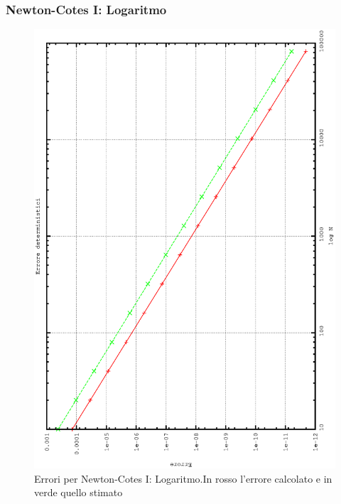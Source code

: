 \subsubsection{Newton-Cotes I: Logaritmo}
\begin{figure}[!h]
\centering
\includegraphics[width=0.7\columnwidth,angle=-90]{plot_trap_log.eps}
\caption{\small{Errori per Newton-Cotes I: Logaritmo.In rosso l'errore calcolato e in verde quello stimato}}
\end{figure}

